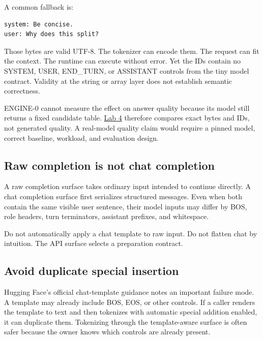 A common fallback is:

\begin{verbatim}
system: Be concise.
user: Why does this split?
\end{verbatim}

Those bytes are valid UTF-8. The tokenizer can encode them. The request
can fit the context. The runtime can execute without error. Yet the IDs
contain no SYSTEM, USER, END\_TURN, or ASSISTANT controls from the tiny
model contract. Validity at the string or array layer does not establish
semantic correctness.

ENGINE-0 cannot measure the effect on answer quality because its model
still returns a fixed candidate table.
\href{https://github.com/hermonai/inside-the-llm-engine/blob/astra-visual-rewrite/labs/lab-04-use-the-wrong-chat-template.md}{Lab
4} therefore compares exact bytes and IDs, not generated quality. A
real-model quality claim would require a pinned model, correct baseline,
workload, and evaluation design.

\subsection{Raw completion is not chat
completion}\label{raw-completion-is-not-chat-completion}

A raw completion surface takes ordinary input intended to continue
directly. A chat completion surface first serializes structured
messages. Even when both contain the same visible user sentence, their
model inputs may differ by BOS, role headers, turn terminators,
assistant prefixes, and whitespace.

Do not automatically apply a chat template to raw input. Do not flatten
chat by intuition. The API surface selects a preparation contract.

\subsection{Avoid duplicate special
insertion}\label{avoid-duplicate-special-insertion}

Hugging Face's official chat-template guidance notes an important
failure mode. A template may already include BOS, EOS, or other
controls. If a caller renders the template to text and then tokenizes
with automatic special addition enabled, it can duplicate them.
Tokenizing through the template-aware surface is often safer because the
owner knows which controls are already present.

